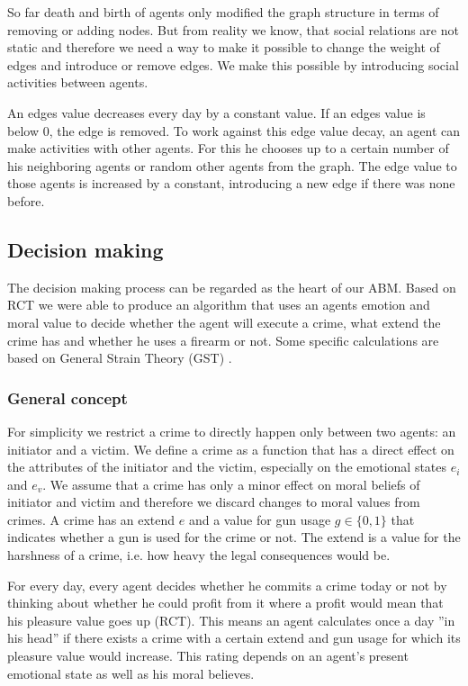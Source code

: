 \documentclass{JASSS}
\begin{document}
    So far death and birth of agents only modified the graph structure in terms of removing or adding nodes.
    But from reality we know, that social relations are not static and therefore we need a way to make it possible to change the weight of edges and introduce or remove edges.
    We make this possible by introducing social activities between agents.

    An edges value decreases every day by a constant value.
    If an edges value is below 0, the edge is removed.
    To work against this edge value decay, an agent can make activities with other agents.
    For this he chooses up to a certain number of his neighboring agents or random other agents from the graph.
    The edge value to those agents is increased by a constant, introducing a new edge if there was none before.

    \subsection{Decision making}

    The decision making process can be regarded as the heart of our ABM.
    Based on RCT we were able to produce an algorithm that uses an agents emotion and moral value to decide whether the agent will execute a crime, what extend the crime has and whether he uses a firearm or not.
    Some specific calculations are based on General Strain Theory (GST) \citep{generalstrain}.

    \subsubsection{General concept}

    For simplicity we restrict a crime to directly happen only between two agents: an initiator and a victim.
    We define a crime as a function that has a direct effect on the attributes of the initiator and the victim, especially on the emotional states $e_i$ and $e_v$.
    We assume that a crime has only a minor effect on moral beliefs of initiator and victim and therefore we discard changes to moral values from crimes.
    A crime has an extend $e$ and a value for gun usage $g \in \{0,1\}$ that indicates whether a gun is used for the crime or not.
    The extend is a value for the harshness of a crime, i.e. how heavy the legal consequences would be.

    For every day, every agent decides whether he commits a crime today or not by thinking about whether he could profit from it where a profit would mean that his pleasure value goes up (RCT).
    This means an agent calculates once a day ''in his head'' if there exists a crime with a certain extend and gun usage for which its pleasure value would increase. This rating depends on an agent's present emotional state as well as his moral believes.
\end{document}
